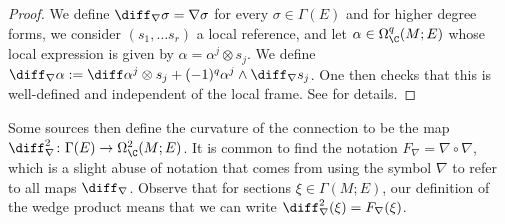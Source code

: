\begin{proof}
    We define \(\diff_\nabla\sigma=\nabla \sigma\) for every \(\sigma \in \Gamma(E)\) and for higher degree forms, we consider \((s_1, \ldots s_r)\)  a local reference, and let \(\alpha \in \Omega_\C^q(M;E)\) whose local expression is given by \(\alpha = \alpha ^j \otimes s_j\). We define \(\diff_\nabla \alpha:=\diff \alpha^j \otimes s_j + (-1)^q \alpha ^j \wedge \diff_\nabla s_j \). One then checks that this is well-defined and independent of the local frame. See \parencite[Prop. 7.11]{lee_introCM} for details.
\end{proof}

Some sources then define the curvature of the connection to be the map \(\diff_\nabla^2 \colon \Gamma(E) \to \Omega_\C^2(M;E)\). It is common to find the notation \(F_\nabla=\nabla \circ \nabla\), which is a slight abuse of notation that comes from using the symbol \(\nabla\) to refer to all maps \(\diff_\nabla\). Observe that for sections \(\xi \in \Gamma(M;E)\), our definition of the wedge product means that we can write \(\diff_\nabla^2(\xi)=F_\nabla(\xi)\). \\


